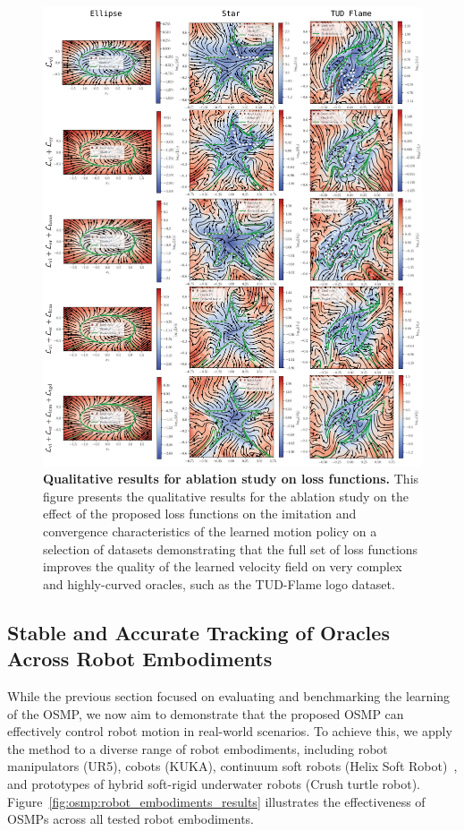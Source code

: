 \begin{figure}[ht!]
    \centering
    \includegraphics[width=1.0\linewidth]{osmp/figures/ablation_study_loss_functions_results/ablation_study_loss_functions_results_v1_compressed.pdf}
    \caption{\textbf{Qualitative results for ablation study on loss functions.}
    This figure presents the qualitative results for the ablation study on the effect of the proposed loss functions on the imitation and convergence characteristics of the learned motion policy on a selection of datasets demonstrating that the full set of loss functions improves the quality of the learned velocity field on very complex and highly-curved oracles, such as the TUD-Flame logo dataset. 
    }
    \label{fig:osmp:ablation_study_loss_functions}
\end{figure}

\subsection{Stable and Accurate Tracking of Oracles Across Robot Embodiments}
While the previous section focused on evaluating and benchmarking the learning of the \gls{OSMP}, we now aim to demonstrate that the proposed \gls{OSMP} can effectively control robot motion in real-world scenarios. To achieve this, we apply the method to a diverse range of robot embodiments, including robot manipulators (UR5), cobots (KUKA), continuum soft robots (Helix Soft Robot)~\citep{guan2023trimmed}, and prototypes of hybrid soft-rigid underwater robots (Crush turtle robot).
Figure~\ref{fig:osmp:robot_embodiments_results} illustrates the effectiveness of \glspl{OSMP} across all tested robot embodiments.

